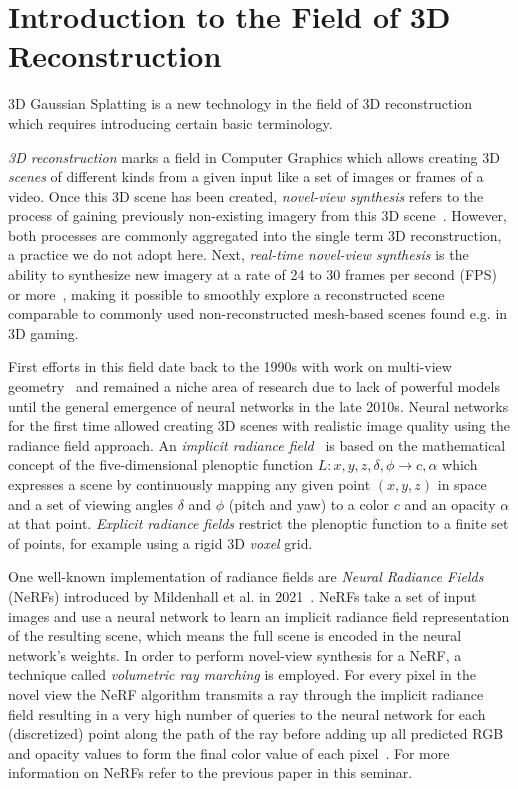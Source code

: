 \section{Introduction to the Field of 3D Reconstruction}
3D Gaussian Splatting is a new technology in the field of 3D reconstruction which requires introducing certain basic terminology.

\textit{3D reconstruction} marks a field in Computer Graphics which allows creating 3D \textit{scenes} of different kinds from a given input like a set of images or frames of a video.
Once this 3D scene has been created, \textit{novel-view synthesis} refers to the process of gaining previously non-existing imagery from this 3D scene~\cite{liuSurvey3DReconstruction2025, tewariStateArtNeural2020}. However, both processes are commonly aggregated into the single term 3D reconstruction, a practice we do not adopt here.
Next, \textit{real-time novel-view synthesis} is the ability to synthesize new imagery at a rate of 24 to 30 frames per second (FPS) or more~\cite{heSurvey3DGaussian2026}, making it possible to smoothly explore a reconstructed scene comparable to commonly used non-reconstructed mesh-based scenes found e.g. in 3D gaming.

First efforts in this field date back to the 1990s with work on multi-view geometry~\cite{liuSurvey3DReconstruction2025} and remained a niche area of research due to lack of powerful models until the general emergence of neural networks in the late 2010s. 
Neural networks for the first time allowed creating 3D scenes with realistic image quality using the radiance field approach.
An \textit{implicit radiance field}~\cite{hubertEditingImplicitExplicit2025a} is based on the mathematical concept of the five-dimensional plenoptic function $L: x, y, z, \delta, \phi \rightarrow c, \alpha$ which expresses a scene by continuously mapping any given point $(x, y, z)$ in space and a set of viewing angles $\delta$ and $\phi$ (pitch and yaw) to a color $c$ and an opacity $\alpha$ at that point.
\begingroup
{}
\textit{Explicit radiance fields} restrict the plenoptic function to a finite set of points, for example using a rigid 3D \textit{voxel} grid.
\par
\endgroup

One well-known implementation of radiance fields are \textit{Neural Radiance Fields} (NeRFs) introduced by Mildenhall et al. in 2021~\cite{mildenhallNeRFRepresentingScenes2020}. NeRFs take a set of input images and use a neural network to learn an implicit radiance field representation of the resulting scene, which means the full scene is encoded in the neural network's weights.
In order to perform novel-view synthesis for a NeRF, a technique called \textit{volumetric ray marching} is employed. 
For every pixel in the novel view the NeRF algorithm transmits a ray through the implicit radiance field resulting in a very high number of queries to the neural network for each (discretized) point along the path of the ray before adding up all predicted RGB and opacity values to form the final color value of each pixel~\cite{mildenhallNeRFRepresentingScenes2020}.
For more information on NeRFs refer to the previous paper in this seminar.

